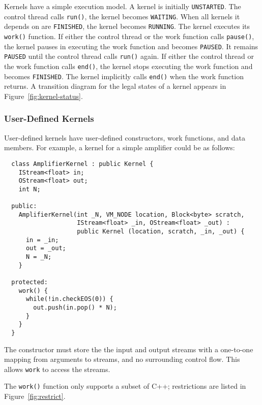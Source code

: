 Kernels have a simple execution model. 
A kernel is initially {\tt UNSTARTED}. 
The control thread calls {\tt run()}, the kernel becomes {\tt WAITING}.
When all kernels it depends on are {\tt FINISHED}, the kernel becomes {\tt RUNNING}.
The kernel executes its {\tt work()} function. 
If either the control thread or the work function calls {\tt pause()},
the kernel pauses in executing the work function and becomes {\tt PAUSED}.
It remains {\tt PAUSED} until the control thread calls {\tt run()} again.
If either the control thread or the work function calls {\tt end()},
the kernel stops executing the work function and becomes {\tt FINISHED}.
The kernel implicitly calls {\tt end()} when the work function returns.
A transition
diagram for the legal states of a kernel appears in
Figure~\ref{fig:kernel-status}.

\subsubsection{User-Defined Kernels}
\label{sec:kernelhlc}

User-defined kernels have user-defined constructors, work functions,
and data members. For example, a kernel for a simple amplifier could be as follows:
{\small
\begin{verbatim}
  class AmplifierKernel : public Kernel {
    IStream<float> in;
    OStream<float> out;
    int N;

  public:
    AmplifierKernel(int _N, VM_NODE location, Block<byte> scratch, 
                    IStream<float> _in, OStream<float> _out) : 
                    public Kernel (location, scratch, _in, _out) {
      in = _in;
      out = _out;
      N = _N;
    }

  protected:
    work() {
      while(!in.checkEOS(0)) {
        out.push(in.pop() * N);
      }
    }
  }  
\end{verbatim}}


The constructor must store the the input and output streams
with a one-to-one mapping from arguments to streams, and no surrounding
control flow.  This allows {\tt work} to access the streams.

The {\tt work()} function only supports a subset of C++; restrictions
are listed in Figure~\ref{fig:restrict}.  

